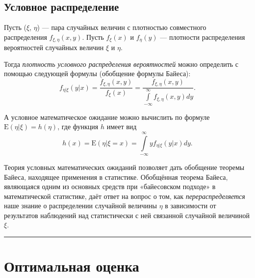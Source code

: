 \documentclass[11pt,a4paper]{article}
\begin{document}
    \begin{center}
    \end{center}
    
    \hypertarget{ux443ux441ux43bux43eux432ux43dux43eux435-ux440ux430ux441ux43fux440ux435ux434ux435ux43bux435ux43dux438ux435}{%
\subsection{Условное
распределение}\label{ux443ux441ux43bux43eux432ux43dux43eux435-ux440ux430ux441ux43fux440ux435ux434ux435ux43bux435ux43dux438ux435}}

Пусть (\(\xi\), \(\eta\)) --- пара случайных величин с плотностью
совместного распределения \(f_{\xi,\eta}(x, y)\). Пусть \(f_{\xi}(x)\) и
\(f_{\eta}(y)\) --- плотности распределения вероятностей случайных
величин \(\xi\) и \(\eta\).

Тогда \emph{плотность условного распределения вероятностей} можно
определить с помощью следующей формулы (обобщение формулы Байеса): \[
  f_{\eta|\xi}(y|x) = \frac{f_{\xi,\eta}(x, y)}{f_{\xi}(x)} = \frac{f_{\xi,\eta}(x, y)}{\int\limits_{-\infty}^{\infty} f_{\xi,\eta}(x,y) dy}.
\]

А условное математическое ожидание можно вычислить по формуле
\(\mathrm{E}(\eta|\xi) = h(\eta)\), где функция \(h\) имеет вид \[
  h(x) = \mathrm{E}(\eta|\xi=x) = \int\limits_{-\infty}^{\infty} y f_{\eta|\xi}(y|x) dy.
\]

    Теория условных математических ожиданий позволяет дать обобщение теоремы
Байеса, находящее применения в статистике. Обобщённая теорема Байеса,
являющаяся одним из основных средств при «байесовском подходе» в
математической статистике, даёт ответ на вопрос о том, как
\emph{перераспределяется} наше знание о распределении случайной величины
\(\eta\) в зависимости от результатов наблюдений над статистически с ней
связанной случайной величиной \(\xi\).

    \begin{center}\rule{0.5\linewidth}{0.5pt}\end{center}

    \hypertarget{ux43eux43fux442ux438ux43cux430ux43bux44cux43dux430ux44f-ux43eux446ux435ux43dux43aux430}{%
\section{Оптимальная
оценка}\label{ux43eux43fux442ux438ux43cux430ux43bux44cux43dux430ux44f-ux43eux446ux435ux43dux43aux430}}
\end{document}
